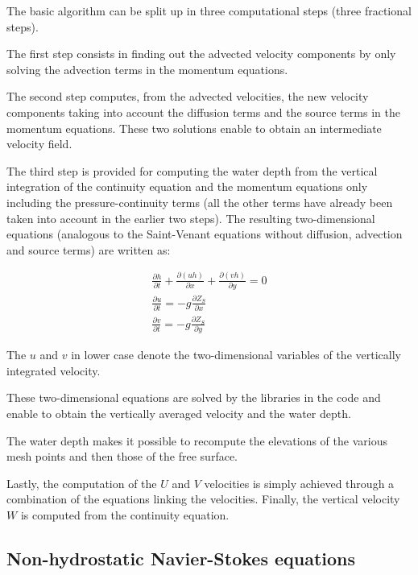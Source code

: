 The  basic algorithm can be split up in three computational steps
(three fractional steps).

The first step consists in finding out the advected velocity components by
only solving the advection terms in the momentum equations.

The second step computes, from the advected velocities, the new velocity
components taking into account the diffusion terms and the source terms in the
momentum equations. These two solutions enable to obtain an intermediate
velocity field.

The third step is provided for computing the water depth from the vertical
integration of the continuity equation and the momentum equations only
including the pressure-continuity terms (all the other terms have already been
taken into account in the earlier two steps). The resulting two-dimensional
equations (analogous to the Saint-Venant equations without diffusion, advection
and source terms) are written as:

\begin{subequations}
\begin{align}
\frac{\partial h}{\partial t} +\frac{\partial \left(uh\right)}{\partial x}
+\frac{\partial \left(vh\right)}{\partial y} =0
\\
\frac{\partial u}{\partial t} =-g\frac{\partial Z_{S} }{\partial x}
\\
\frac{\partial v}{\partial t} =-g\frac{\partial Z_{S} }{\partial y}
\end{align}
\end{subequations}

The $u$ and $v$ in lower case denote the two-dimensional
variables of the vertically integrated velocity.

These two-dimensional equations are solved by the libraries in the 
code and enable to obtain the vertically averaged velocity and the water depth.

The water depth makes it possible to recompute the elevations of the various
mesh points and then those of the free surface.

Lastly, the computation of the $U$ and $V$ velocities is simply achieved
through a combination of the equations linking the velocities. Finally, the
vertical velocity $W$ is computed from the continuity equation.

\subsection{Non-hydrostatic Navier-Stokes equations}

